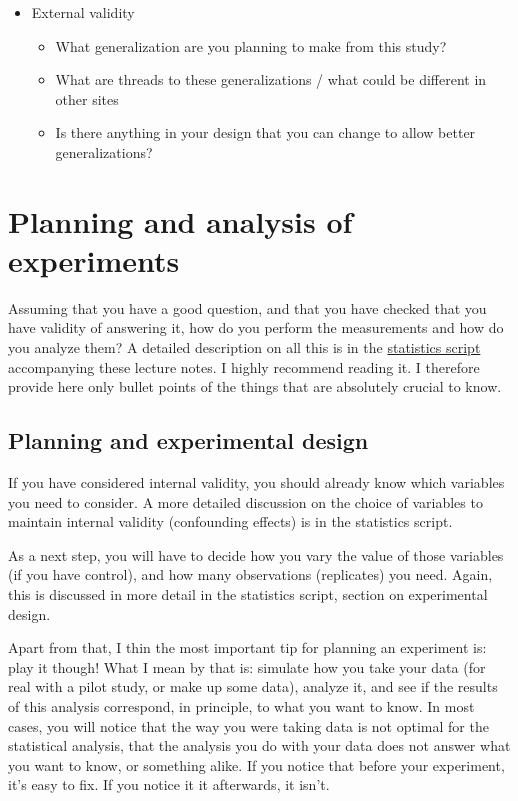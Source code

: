 \documentclass{tufte-book}
\begin{document}
\begin{mdframed}
\begin{itemize}
      \item External validity
      \begin{itemize}
        \item What generalization are you planning to make from this study?
        \item What are threads to these generalizations / what could be different in other sites
        \item Is there anything in your design that you can change to allow better generalizations?
      \end{itemize}   
    \end{itemize}

\end{mdframed}


\section{Planning and analysis of experiments} 

Assuming that you have a good question, and that you have checked that you have validity of answering it, how do you perform the measurements and how do you analyze them? A detailed description on all this is in the \href{https://github.com/florianhartig/ResearchSkills/raw/master/Labs/Statistics/Script/EssentialStatistics.pdf}{statistics script} accompanying these lecture notes. I highly recommend reading it. I therefore provide here only bullet points of the things that are absolutely crucial to know. 


\subsection{Planning and experimental design}

If you have considered internal validity, you should already know which variables you need to consider. A more detailed discussion on the choice of variables to maintain internal validity (confounding effects) is in the statistics script. 

As a next step, you will have to decide how you vary the value of those variables (if you have control), and how many observations (replicates) you need. Again, this is discussed in more detail in the statistics script, section on experimental design.

Apart from that, I thin the most important tip for planning an experiment is: play it though! What I mean by that is: simulate how you take your data (for real with a pilot study, or make up some data), analyze it, and see if the results of this analysis correspond, in principle, to what you want to know. In most cases, you will notice that the way you were taking data is not optimal for the statistical analysis, that the analysis you do with your data does not answer what you want to know, or something alike. If you notice that before your experiment, it's easy to fix. If you notice it it afterwards, it isn't. 
\end{document}
